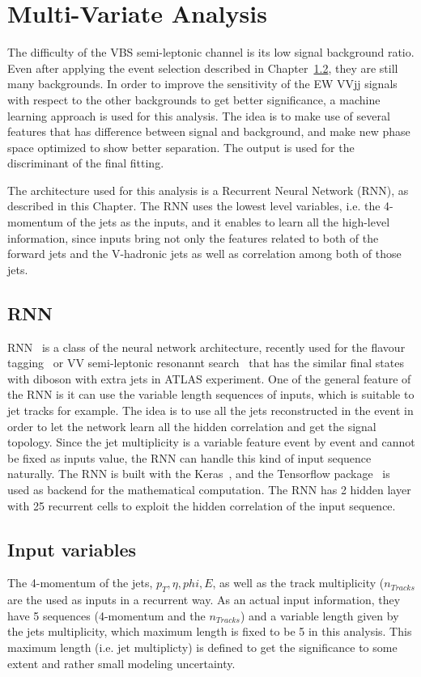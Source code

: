 \chapter{Multi-Variate Analysis}

The difficulty of the VBS semi-leptonic channel is its low signal background ratio. Even after applying the event selection described in Chapter~\ref{}, they are still many backgrounds. In order to improve the sensitivity of the EW VVjj signals with respect to the other backgrounds to get better significance, a machine learning approach is used for this analysis.
The idea is to make use of several features that has difference between signal and background, and make new phase space optimized to show better separation. The output is used for the discriminant of the final fitting.

The architecture used for this analysis is a Recurrent Neural Network (RNN), as described in this Chapter.
The RNN uses the lowest level variables, i.e. the 4-momentum of the jets as the inputs, and it enables to learn all the high-level information, since inputs bring not only the features related to both of the forward jets and the V-hadronic jets as well as correlation among both of those jets.

\section{RNN}
RNN~\cite{Sherstinsky_2020} is a class of the neural network architecture, recently used for the flavour tagging~\cite{ATL-PHYS-PUB-2017-003} or VV semi-leptonic resonannt search~\cite{HDBS-2018-10} that has the similar final states with diboson  with extra jets in ATLAS experiment.
One of the general feature of the RNN is it can use the variable length sequences of inputs, which is suitable to jet tracks for example.
The idea is to use all the jets reconstructed in the event in order to let the network learn all the hidden correlation and get the signal topology.
Since the jet multiplicity is a variable feature event by event and cannot be fixed as inputs value, the RNN can handle this kind of input sequence naturally.
The RNN is built with the Keras~\cite{chollet2015keras}, and the Tensorflow package~\cite{tensorflow2015-whitepaper} is used as backend for the mathematical computation. The RNN has 2 hidden layer with 25 recurrent cells to exploit the hidden correlation of the input sequence.

\section{Input variables}
The 4-momentum of the jets, $p_T, \eta, phi, E$, as well as the track multiplicity ($n_{Tracks}$ are the used as inputs in a recurrent way. As an actual input information, they have 5 sequences (4-momentum and the $n_{Tracks}$) and a variable length given by the jets multiplicity, which maximum length is fixed to be 5 in this analysis. This maximum length (i.e. jet multiplicty) is defined to get the significance to some extent and rather small modeling uncertainty.

